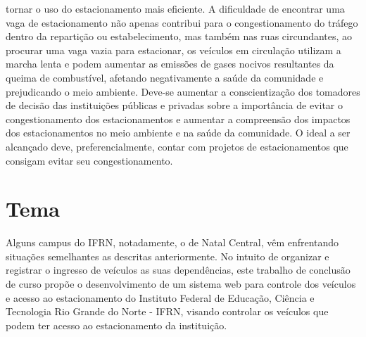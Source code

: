 tornar o uso do estacionamento mais eficiente. A dificuldade de encontrar uma vaga de estacionamento não apenas contribui para o congestionamento do tráfego dentro da repartição ou estabelecimento, mas também nas ruas circundantes, ao procurar uma vaga vazia para estacionar, os veículos em circulação utilizam a marcha lenta e podem aumentar as emissões de gases nocivos resultantes da queima de combustível, afetando negativamente a saúde da comunidade e prejudicando o meio ambiente. Deve-se
aumentar a conscientização dos tomadores de decisão das instituições públicas e privadas sobre a importância de evitar o congestionamento dos estacionamentos e
aumentar a compreensão dos impactos dos estacionamentos no meio ambiente e na saúde da comunidade.
O ideal a ser alcançado deve, preferencialmente, contar com projetos de estacionamentos que consigam evitar seu congestionamento.




\section{Tema}
 Alguns campus do IFRN, notadamente, o de Natal Central, vêm enfrentando situações semelhantes as descritas anteriormente. No intuito de organizar e registrar o ingresso de veículos as suas  dependências, este trabalho de conclusão de curso propõe o desenvolvimento de um sistema web para controle dos veículos e acesso ao estacionamento do Instituto Federal de Educação, Ciência e Tecnologia Rio Grande do Norte - IFRN, visando controlar os veículos que podem ter acesso ao estacionamento da instituição.  
 
